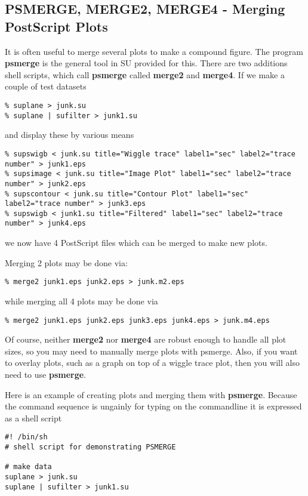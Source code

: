 {{{{{{{\subsection{PSMERGE, MERGE2, MERGE4 - Merging PostScript Plots}

It is often useful to merge several plots to make a compound
figure.
The program {\bf psmerge\/} is the general tool in SU provided
for this. 
There are two additions shell scripts, which call {\bf psmerge\/}
called {\bf merge2\/} and {\bf merge4}.
If we make a couple of test datasets
{\small\begin{verbatim}
% suplane > junk.su
% suplane | sufilter > junk1.su
\end{verbatim}}\noindent
and display these by various means
{\small\begin{verbatim}
% supswigb < junk.su title="Wiggle trace" label1="sec" label2="trace number" > junk1.eps
% supsimage < junk.su title="Image Plot" label1="sec" label2="trace number" > junk2.eps
% supscontour < junk.su title="Contour Plot" label1="sec" label2="trace number" > junk3.eps
% supswigb < junk1.su title="Filtered" label1="sec" label2="trace number" > junk4.eps
\end{verbatim}}\noindent
we now have 4 PostScript files which can be merged to make new plots.

Merging 2 plots may be done via:
{\small\begin{verbatim}
% merge2 junk1.eps junk2.eps > junk.m2.eps
\end{verbatim}}\noindent
while merging all 4 plots may be done via 
{\small\begin{verbatim}
% merge2 junk1.eps junk2.eps junk3.eps junk4.eps > junk.m4.eps
\end{verbatim}}\noindent
Of course, neither {\bf merge2\/} nor {\bf merge4\/} are robust
enough to handle all plot sizes, so you may need to manually 
merge plots with psmerge. Also, if you want to overlay plots,
such as a graph on top of a wiggle trace plot, then you will
also need to use {\bf psmerge}.

Here is an example of creating plots and merging them with {\bf psmerge\/}.
Because the command sequence is ungainly for typing on the commandline
it is expressed as a shell script

{\small\begin{verbatim}
#! /bin/sh
# shell script for demonstrating PSMERGE

# make data
suplane > junk.su
suplane | sufilter > junk1.su


\end{verbatim}}}}}}}}}
